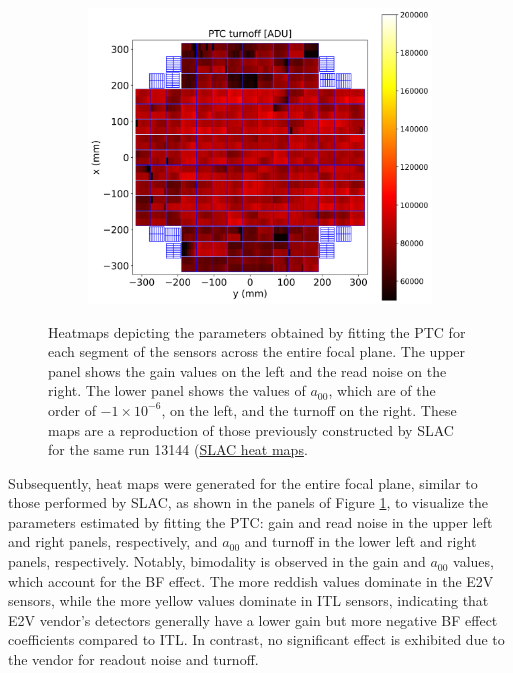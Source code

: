 \begin{figure}[!htb]
\begin{subfigure}[b]{0.49\textwidth}
     \end{subfigure}    
     \hfill
     \begin{subfigure}[b]{0.49\textwidth}
         \centering
         \includegraphics[width=\textwidth]{Figures/Focal_plane_turnoff.png}
     \end{subfigure}
        \caption{Heatmaps depicting the parameters obtained by fitting the PTC for each segment of the sensors across the entire focal plane. The upper panel shows the gain values on the left and the read noise on the right. The lower panel shows the values of $a_{00}$, which are of the order of $-1 \times 10 ^{-6}$, on the left, and the turnoff on the right. These maps are a reproduction of those previously constructed by SLAC for the same run 13144 (\href{https://srs.slac.stanford.edu/BOT_EO_Reports/13144/}{SLAC heat maps}.}
        \label{fig:FocalPlane_PTC}
\end{figure}
Subsequently, heat maps were generated for the entire focal plane, similar to those performed by SLAC, as shown in the panels of Figure \ref{fig:FocalPlane_PTC}, to visualize the parameters estimated by fitting the PTC: gain and read noise in the upper left and right panels, respectively, and $a_{00}$ and turnoff in the lower left and right panels, respectively. Notably, bimodality is observed in the gain and $a_{00}$ values, which account for the BF effect. The more reddish values dominate in the E2V sensors, while the more yellow values dominate in ITL sensors, indicating that E2V vendor's detectors generally have a lower gain but more negative BF effect coefficients compared to ITL. In contrast, no significant effect is exhibited due to the vendor for readout noise and turnoff.

